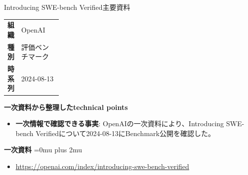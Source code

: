 \begin{technicalnote}{Introducing SWE-bench Verified}{主要資料}
\begingroup
\begin{tabularx}{\linewidth}{@{}>{\bfseries}p{0.22\linewidth}X@{}}
組織 & OpenAI \\
種別 & 評価ベンチマーク \\
時系列 & 2024-08-13 \\
\end{tabularx}
\smallskip
{\bfseries 一次資料から整理したtechnical points}
\begin{itemize}[leftmargin=1.5em,itemsep=0.35em]
\item \textbf{一次情報で確認できる事実}: OpenAIの一次資料により、Introducing SWE-bench Verifiedについて2024-08-13にBenchmark公開を確認した。
\end{itemize}
\begin{minipage}{\linewidth}
\begin{samepage}
{\bfseries 一次資料}
\begingroup\sloppy
\Urlmuskip=0mu plus 2mu\relax
\begin{itemize}[leftmargin=1.5em,itemsep=0.25em]
\item {\scriptsize\url{https://openai.com/index/introducing-swe-bench-verified}}
\end{itemize}
\endgroup
\end{samepage}
\end{minipage}
\endgroup
\end{technicalnote}
\medskip

